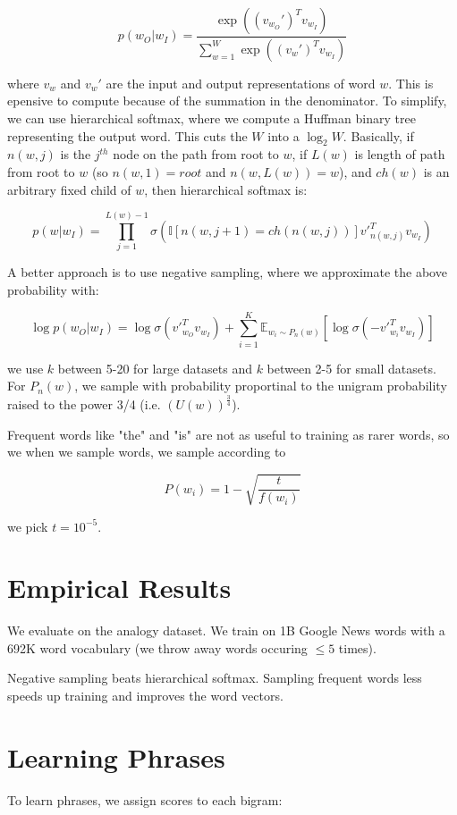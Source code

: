 \documentclass[a4paper]{article}
\begin{document}
$$
p(w_O | w_I) = \frac{\exp{((v_{w_O}')^T v_{w_I})}}{
\sum_{w=1}^{W}{\exp{((v_{w}')^T v_{w_I})}}
}
$$

where $v_{w}$ and $v_{w}'$ are the input and output representations of word $w$.
This is epensive to compute because of the summation in the denominator. To
simplify, we can use hierarchical softmax, where we compute a Huffman binary
tree representing the output word. This cuts the $W$ into a $\log_2 W$.
Basically, if $n(w, j)$ is the $j^{th}$ node on the path from root to $w$,
if $L(w)$ is length of path from root to $w$ (so $n(w, 1) = root$ and
$n(w, L(w)) = w$), and $ch(w)$ is an arbitrary fixed child of $w$, then
hierarchical softmax is:

$$
p(w | w_I) = \prod_{j=1}^{L(w) - 1}{\sigma(
\mathbb{I}[n(w, j + 1) = ch(n(w, j))] v'_{n(w, j)}^T v_{w_I}
)}
$$

A better approach is to use negative sampling, where we approximate the above
probability with:

$$
\log p(w_O | w_I) = \log{\sigma(v'_{w_O}^T v_{w_I})} + \sum_{i=1}^{K}{
\mathbb{E}_{w_i \sim P_n(w)}[\log{\sigma(-v'_{w_i}^T v_{w_I})}]
}
$$

we use $k$ between 5-20 for large datasets and $k$ between 2-5 for small
datasets. For $P_n(w)$, we sample with probability proportinal to the unigram
probability raised to the power 3/4 (i.e. $(U(w))^{\frac{3}{4}}$).

Frequent words like "the" and "is" are not as useful to training as rarer
words, so we when we sample words, we sample according to

$$
P(w_i) = 1 - \sqrt{\frac{t}{f(w_i)}}
$$

we pick $t = 10^{-5}$.

\section{Empirical Results}
We evaluate on the analogy dataset. We train on 1B Google News words with a
692K word vocabulary (we throw away words occuring $\leq 5$ times).

Negative sampling beats hierarchical softmax. Sampling frequent words less
speeds up training and improves the word vectors.

\section{Learning Phrases}
To learn phrases, we assign scores to each bigram:
\end{document}

